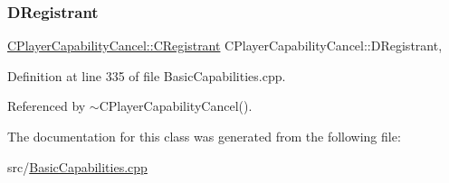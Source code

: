 \subsubsection{\texorpdfstring{D\+Registrant}{DRegistrant}}
{\footnotesize\ttfamily \hyperlink{classCPlayerCapabilityCancel_1_1CRegistrant}{C\+Player\+Capability\+Cancel\+::\+C\+Registrant} C\+Player\+Capability\+Cancel\+::\+D\+Registrant\hspace{0.3cm}{\ttfamily [static]}, {\ttfamily [protected]}}



Definition at line 335 of file Basic\+Capabilities.\+cpp.



Referenced by $\sim$\+C\+Player\+Capability\+Cancel().



The documentation for this class was generated from the following file\+:\begin{DoxyCompactItemize}
\item 
src/\hyperlink{BasicCapabilities_8cpp}{Basic\+Capabilities.\+cpp}\end{DoxyCompactItemize}
